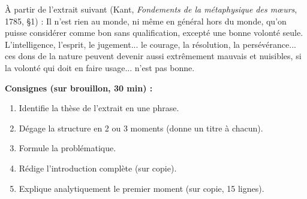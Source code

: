 \documentclass[11pt]{article}
\begin{document}
\begin{exercice}
À partir de l'extrait suivant (Kant, \emph{Fondements de la métaphysique des mœurs}, 1785, §1) :
\guillemotleft Il n'est rien au monde, ni même en général hors du monde, qu'on puisse considérer comme bon sans qualification, excepté une bonne volonté seule. L'intelligence, l'esprit, le jugement... le courage, la résolution, la persévérance... ces dons de la nature peuvent devenir aussi extrêmement mauvais et nuisibles, si la volonté qui doit en faire usage... n'est pas bonne. \guillemotright

\textbf{Consignes (sur brouillon, 30 min) :}
\begin{enumerate}
    \item Identifie la thèse de l'extrait en une phrase.
    \item Dégage la structure en 2 ou 3 moments (donne un titre à chacun).
    \item Formule la problématique.
    \item Rédige l'introduction complète (sur copie).
    \item Explique analytiquement le premier moment (sur copie, 15 lignes).
\end{enumerate}
\end{exercice}
\end{document}
